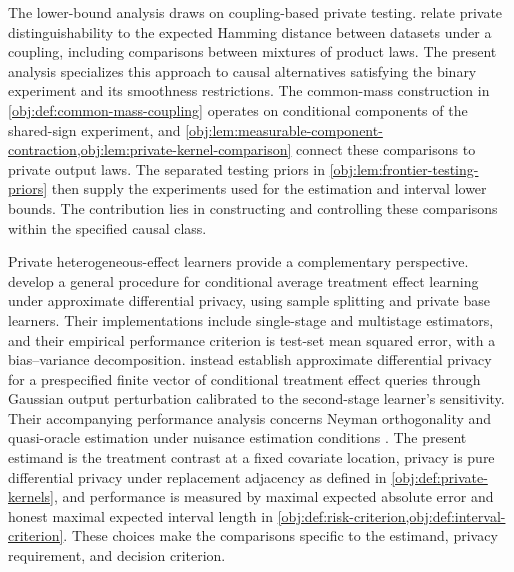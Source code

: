 The lower-bound analysis draws on coupling-based private testing. \citet[][Section 2]{AcharyaSunZhang2021} relate private distinguishability to the expected Hamming distance between datasets under a coupling, including comparisons between mixtures of product laws. The present analysis specializes this approach to causal alternatives satisfying the binary experiment and its smoothness restrictions. The common-mass construction in \cref{obj:def:common-mass-coupling} operates on conditional components of the shared-sign experiment, and \cref{obj:lem:measurable-component-contraction,obj:lem:private-kernel-comparison} connect these comparisons to private output laws. The separated testing priors in \cref{obj:lem:frontier-testing-priors} then supply the experiments used for the estimation and interval lower bounds. The contribution lies in constructing and controlling these comparisons within the specified causal class.

Private heterogeneous-effect learners provide a complementary perspective. \citet{NiuEtAl2022} develop a general procedure for conditional average treatment effect learning under approximate differential privacy, using sample splitting and private base learners. Their implementations include single-stage and multistage estimators, and their empirical performance criterion is test-set mean squared error, with a bias--variance decomposition. \citet[][Theorem 1]{SchroderMelnychukFeuerriegel2025} instead establish approximate differential privacy for a prespecified finite vector of conditional treatment effect queries through Gaussian output perturbation calibrated to the second-stage learner's sensitivity. Their accompanying performance analysis concerns Neyman orthogonality and quasi-oracle estimation under nuisance estimation conditions \citep[][Theorem 2]{SchroderMelnychukFeuerriegel2025}. The present estimand is the treatment contrast at a fixed covariate location, privacy is pure differential privacy under replacement adjacency as defined in \cref{obj:def:private-kernels}, and performance is measured by maximal expected absolute error and honest maximal expected interval length in \cref{obj:def:risk-criterion,obj:def:interval-criterion}. These choices make the comparisons specific to the estimand, privacy requirement, and decision criterion.

